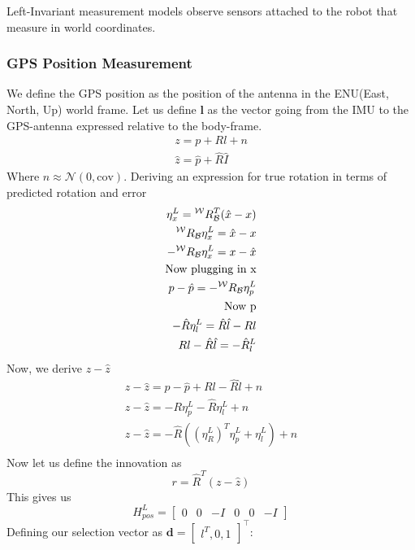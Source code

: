 Left-Invariant measurement models observe sensors attached to the robot that measure in world coordinates.

\subsubsection{GPS Position Measurement}
We define the GPS position as the position of the antenna in the ENU(East, North, Up) world frame. Let us define $\mathbf{l}$ as the vector going from the IMU to the GPS-antenna expressed relative to the body-frame. \begin{equation}
\begin{gathered}
z = p + Rl+n\\
\hat z = \hat p + \hat R \hat I 
    \end{gathered}
\end{equation}
Where $n \approx \mathcal{N}(0,\text{cov} )$. Deriving an expression for true rotation in terms of predicted rotation and error
\begin{equation}
  \begin{aligned}
    \eta^L_x = {}^\mathcal{W}R_\mathcal{B}^T(\hat x - x)\\
    {}^\mathcal{W}R_\mathcal{B}\eta^L_x = \hat x - x\\
    -{}^\mathcal{W}R_\mathcal{B}\eta^L_x =  x-\hat x \\
    \text{Now plugging in x}\\
    p - \hat p = -{}^\mathcal{W}R_\mathcal{B}\eta^L_p\\
    \text{Now p}\\
    -\hat R  \eta^L_l = \hat R \hat l - Rl \\
    Rl-\hat R \hat l = - \hat R^L_l 
  \end{aligned}
\end{equation}
Now, we derive $z-\hat z$
\begin{equation}
  \begin{aligned}
z-\hat z =p-\hat p + Rl - \hat R \hat l + n\\
z - \hat z = - R \eta^L_p-\hat R \eta^L_l +n \\
z - \hat z = -\hat R((\eta_R^L)^T\eta^L_p+\eta^L_l)+n\\
  \end{aligned}
\end{equation}
Now let us define the innovation as \begin{equation}
r= \hat R^T(z-\hat z)
\end{equation}
This gives us\begin{equation}
  H^L_{pos}=\begin{bmatrix}
    0&0&-I&0&0&-I
  \end{bmatrix}
\end{equation}
Defining our selection vector as $\mathbf{d}=\begin{bmatrix}
    l^T,0,1
\end{bmatrix}^\top$:


